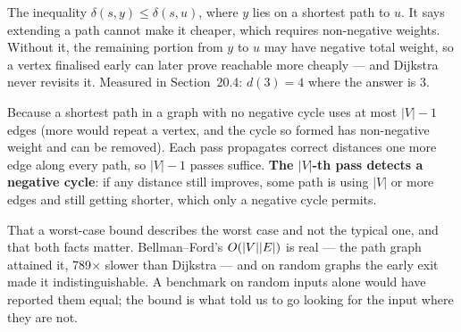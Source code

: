 \begin{ans}
  \item The inequality $\delta(s,y) \le \delta(s,u)$, where $y$ lies on a
        shortest path to $u$. It says extending a path cannot make it cheaper,
        which requires non-negative weights. Without it, the remaining portion
        from $y$ to $u$ may have negative total weight, so a vertex finalised
        early can later prove reachable more cheaply --- and Dijkstra never
        revisits it. Measured in Section~20.4: $d(3) = 4$ where the answer
        is 3.
  \item Because a shortest path in a graph with no negative cycle uses at most
        $|V|-1$ edges (more would repeat a vertex, and the cycle so formed has
        non-negative weight and can be removed). Each pass propagates correct
        distances one more edge along every path, so $|V|-1$ passes suffice.
        \textbf{The $|V|$-th pass detects a negative cycle}: if any distance
        still improves, some path is using $|V|$ or more edges and still
        getting shorter, which only a negative cycle permits.
  \item That a worst-case bound describes the worst case and not the typical
        one, and that both facts matter. Bellman--Ford's $O(|V||E|)$ is
        real --- the path graph attained it, 789$\times$ slower than Dijkstra
        --- and on random graphs the early exit made it indistinguishable. A
        benchmark on random inputs alone would have reported them equal; the
        bound is what told us to go looking for the input where they are not.
\end{ans}

